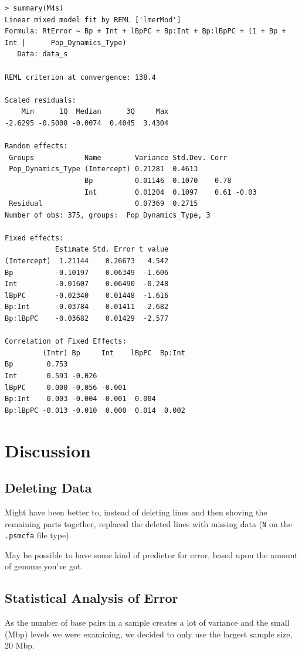 \documentclass[11pt,a4paper]{article}
\begin{document}
\begin{lstlisting}
> summary(M4s)
Linear mixed model fit by REML ['lmerMod']
Formula: RtError ~ Bp + Int + lBpPC + Bp:Int + Bp:lBpPC + (1 + Bp + Int |      Pop_Dynamics_Type)
   Data: data_s

REML criterion at convergence: 138.4

Scaled residuals: 
    Min      1Q  Median      3Q     Max 
-2.6295 -0.5008 -0.0074  0.4045  3.4304 

Random effects:
 Groups            Name        Variance Std.Dev. Corr       
 Pop_Dynamics_Type (Intercept) 0.21281  0.4613              
                   Bp          0.01146  0.1070    0.78      
                   Int         0.01204  0.1097    0.61 -0.03
 Residual                      0.07369  0.2715              
Number of obs: 375, groups:  Pop_Dynamics_Type, 3

Fixed effects:
            Estimate Std. Error t value
(Intercept)  1.21144    0.26673   4.542
Bp          -0.10197    0.06349  -1.606
Int         -0.01607    0.06490  -0.248
lBpPC       -0.02340    0.01448  -1.616
Bp:Int      -0.03784    0.01411  -2.682
Bp:lBpPC    -0.03682    0.01429  -2.577

Correlation of Fixed Effects:
         (Intr) Bp     Int    lBpPC  Bp:Int
Bp        0.753                            
Int       0.593 -0.026                     
lBpPC     0.000 -0.056 -0.001              
Bp:Int    0.003 -0.004 -0.001  0.004       
Bp:lBpPC -0.013 -0.010  0.000  0.014  0.002
\end{lstlisting}

\section{Discussion}
\subsection{Deleting Data}
Might have been better to, instead of deleting lines and then shoving the remaining parts together, replaced the deleted lines with missing data (\verb|N| on the \verb|.psmcfa| file type).

May be possible to have some kind of predictor for error, based upon the amount of genome you've got.

\subsection{Statistical Analysis of Error}
As the number of base pairs in a sample creates a lot of variance and the small (Mbp) levels we were examining, we decided to only use the largest sample size, 20 Mbp.
\end{document}
